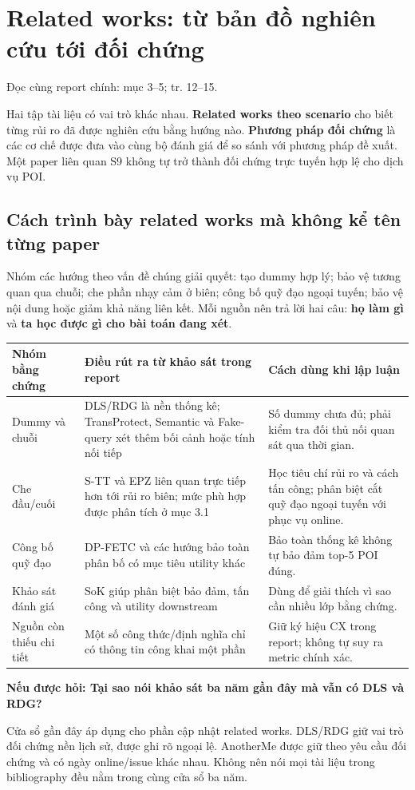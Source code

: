 \documentclass[10pt,a4paper]{article}
\newcommand{\ask}[2]{\par\textbf{Nếu được hỏi: #1}\par #2\par}
\newcommand{\where}[1]{\par{\small\color{gray}Đọc cùng report chính: #1.}\par}
\newcommand{\guidepage}[1]{\clearpage\section{#1}}
\begin{document}
\guidepage{Related works: từ bản đồ nghiên cứu tới đối chứng}
\where{mục 3--5; tr. 12--15}
Hai tập tài liệu có vai trò khác nhau. \textbf{Related works theo scenario} cho biết từng rủi ro đã được nghiên cứu bằng hướng nào. \textbf{Phương pháp đối chứng} là các cơ chế được đưa vào cùng bộ đánh giá để so sánh với phương pháp đề xuất. Một paper liên quan S9 không tự trở thành đối chứng trực tuyến hợp lệ cho dịch vụ POI.

\subsection*{Cách trình bày related works mà không kể tên từng paper}
Nhóm các hướng theo vấn đề chúng giải quyết: tạo dummy hợp lý; bảo vệ tương quan qua chuỗi; che phần nhạy cảm ở biên; công bố quỹ đạo ngoại tuyến; bảo vệ nội dung hoặc giảm khả năng liên kết. Mỗi nguồn nên trả lời hai câu: \textbf{họ làm gì} và \textbf{ta học được gì cho bài toán đang xét}.

\begin{longtable}{@{}P{3.5cm}P{6.1cm}P{6.6cm}@{}}
\toprule Nhóm bằng chứng & Điều rút ra từ khảo sát trong report & Cách dùng khi lập luận\\\midrule
Dummy và chuỗi & DLS/RDG là nền thống kê; TransProtect, Semantic và Fake-query xét thêm bối cảnh hoặc tính nối tiếp & Số dummy chưa đủ; phải kiểm tra đối thủ nối quan sát qua thời gian.\\[4pt]
Che đầu/cuối & S-TT và EPZ liên quan trực tiếp hơn tới rủi ro biên; mức phù hợp được phân tích ở mục 3.1 & Học tiêu chí rủi ro và cách tấn công; phân biệt cắt quỹ đạo ngoại tuyến với phục vụ online.\\[4pt]
Công bố quỹ đạo & DP-FETC và các hướng bảo toàn phân bố có mục tiêu utility khác & Bảo toàn thống kê không tự bảo đảm top-5 POI đúng.\\[4pt]
Khảo sát đánh giá & SoK giúp phân biệt bảo đảm, tấn công và utility downstream & Dùng để giải thích vì sao cần nhiều lớp bằng chứng.\\[4pt]
Nguồn còn thiếu chi tiết & Một số công thức/định nghĩa chỉ có thông tin công khai một phần & Giữ ký hiệu CX trong report; không tự suy ra metric chính xác.\\
\bottomrule
\end{longtable}

\ask{Tại sao nói khảo sát ba năm gần đây mà vẫn có DLS và RDG?}{Cửa sổ gần đây áp dụng cho phần cập nhật related works. DLS/RDG giữ vai trò đối chứng nền lịch sử, được ghi rõ ngoại lệ. AnotherMe được giữ theo yêu cầu đối chứng và có ngày online/issue khác nhau. Không nên nói mọi tài liệu trong bibliography đều nằm trong cùng cửa sổ ba năm.}
\end{document}
